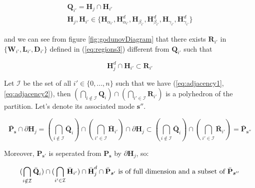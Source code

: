 \documentclass[11pt]{article}
\numberwithin{equation}{section}
\numberwithin{figure}{section}
\numberwithin{table}{section}
\begin{document}
\begin{equation}
\begin{array}{l}
\textbf{Q}_{i'}=\textbf{H}_{j}\cap \textbf{H}_{i'}\\
\textbf{H}_{j}, \textbf{H}_{i'}\in \{\textbf{H}_{\alpha_{i'}}, \textbf{H}^{d}_{\alpha_{i'}}, \textbf{H}_{\beta_{i'}}, \textbf{H}^{d}_{\beta_{i'}}, \textbf{H}_{\gamma_{i'}}, \textbf{H}^{d}_{\gamma_{i'}}\}
\end{array}
\label{eq:adjacency1}
\end{equation}

\noindent and we can see from figure \ref{fig:godunovDiagram} that there exists $\textbf{R}_{i'}$ in $\{\textbf{W}_{i'}, \textbf{L}_{i'}, \textbf{D}_{i'}\}$ defined in (\ref{eq:regions3}) different from $\textbf{Q}_{i'}$ such that

\begin{equation}
\textbf{H}^{d}_{j}\cap \textbf{H}_{i'}\subset \textbf{R}_{i'}
\label{eq:adjacency2}
\end{equation}

\noindent Let $\mathcal{I}$ be the set of all $i'\in\{0,...,n\}$ such that we have (\ref{eq:adjacency1}, \ref{eq:adjacency2}), then $(\bigcap_{i\notin \mathcal{I}} \textbf{Q}_{i})\cap (\bigcap_{i'\in\mathcal{I}}\textbf{R}_{i'})$ is a polyhedron of the partition. Let's denote its associated mode $\boldsymbol s''$.

\begin{equation}
\bar{\textbf{P}}_{\boldsymbol s}\cap \partial \textbf{H}_{j}=(\bigcap_{i\notin \mathcal{I}} \bar{\textbf{Q}}_{i})\cap(\bigcap_{i'\in \mathcal{I}}\bar{\textbf{H}}_{i'})\cap\partial \textbf{H}_{j}\subset (\bigcap_{i\notin \mathcal{I}} \bar{\textbf{Q}}_{i})\cap (\bigcap_{i'\in \mathcal{I}}\bar{\textbf{R}}_{i'})=\bar{\textbf{P}}_{\boldsymbol s''}
\label{eq:adjacency3}
\end{equation}

\noindent Moreover, $\textbf{P}_{\boldsymbol s'}$ is seperated from $\textbf{P}_{\boldsymbol s}$ by $\partial \textbf{H}_{j}$, so:

\begin{equation}
(\bigcap_{i\notin \mathcal{I}} \bar{\textbf{Q}}_{i})\cap(\bigcap_{i'\in \mathcal{I}}\bar{\textbf{H}}_{i'})\cap\bar{\textbf{H}}^{d}_{j}\cap \bar{\textbf{P}}_{\boldsymbol s'} \text{ is of full dimension and a subset of }\bar{\textbf{P}}_{\boldsymbol s''}\\
\label{eq:adjacency4}
\end{equation}
\end{document}
